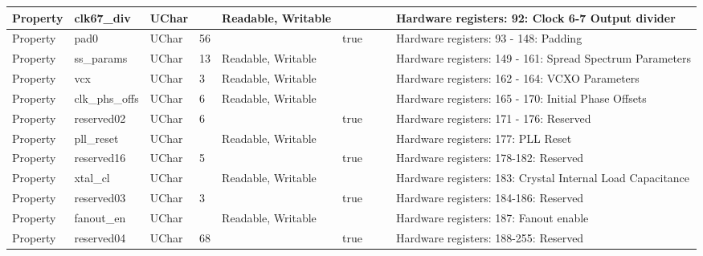 \documentclass{article}
\begin{document}
\begin{landscape}
\begin{scriptsize}
\begin{longtable}[l]{|p{2cm}|p{2cm}|p{1cm}|p{2cm}|p{1.7cm}|p{1cm}|p{2.5cm}|p{1cm}|p{5.88cm}|}
			\hline
      Property     & clk67\_div           & UChar &                 & Readable, Writable  &     &            &         & Hardware registers: 92: Clock 6-7 Output divider \\
			\hline
      Property     & pad0                 & UChar & 56              &                     & true&            &         & Hardware registers: 93 - 148: Padding \\
			\hline
      Property     & ss\_params           & UChar & 13              & Readable, Writable  &     &            &         & Hardware registers: 149 - 161: Spread Spectrum Parameters \\
			\hline
      Property     & vcx                  & UChar & 3               & Readable, Writable  &     &            &         & Hardware registers: 162 - 164: VCXO Parameters \\
			\hline
      Property     & clk\_phs\_offs       & UChar & 6               & Readable, Writable  &     &            &         & Hardware registers: 165 - 170: Initial Phase Offsets \\
			\hline
      Property     & reserved02           & UChar & 6               &                     & true&            &         & Hardware registers: 171 - 176: Reserved \\
			\hline
      Property     & pll\_reset           & UChar &                 & Readable, Writable  &     &            &         & Hardware registers: 177: PLL Reset \\
			\hline
      Property     & reserved16           & UChar & 5               &                     & true&            &         & Hardware registers: 178-182: Reserved \\
			\hline
      Property     & xtal\_cl             & UChar &                 & Readable, Writable  &     &            &         & Hardware registers: 183: Crystal Internal Load Capacitance \\
			\hline
      Property     & reserved03           & UChar & 3               &                     & true&            &         & Hardware registers: 184-186: Reserved \\
			\hline
      Property     & fanout\_en           & UChar &                 & Readable, Writable  &     &            &         & Hardware registers: 187: Fanout enable \\
			\hline
      Property     & reserved04           & UChar & 68              &                     & true&            &         & Hardware registers: 188-255: Reserved \\
			\hline
		\end{longtable}



\end{scriptsize}
\end{landscape}
\end{document}
